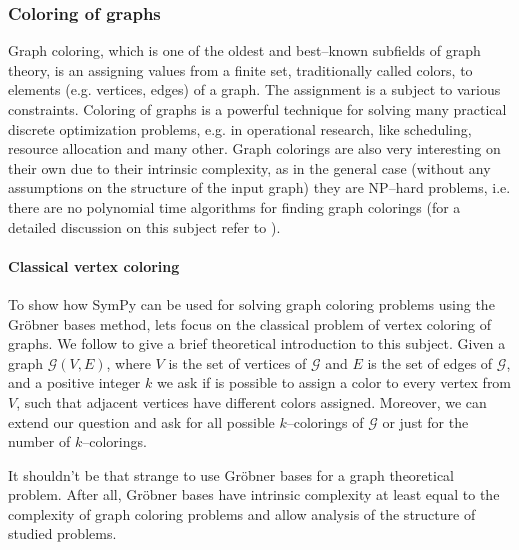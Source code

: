 \subsubsection{Coloring of graphs}

Graph coloring, which is one of the oldest and best--known subfields of graph theory, is an
assigning values from a finite set, traditionally called colors, to elements (e.g. vertices,
edges) of a graph. The assignment is a subject to various constraints. Coloring of graphs is
a powerful technique for solving many practical discrete optimization problems, e.g. in
operational research, like scheduling, resource allocation and many other. Graph colorings
are also very interesting on their own due to their intrinsic complexity, as in the general
case (without any assumptions on the structure of the input graph) they are NP--hard problems,
i.e. there are no polynomial time algorithms for finding graph colorings (for a detailed
discussion on this subject refer to \cite{Kubale2004color}).


\paragraph{Classical vertex coloring}

To show how SymPy can be used for solving graph coloring problems using the Gröbner
bases method, lets focus on the classical problem of vertex coloring of graphs. We follow
\cite{Adams1994intro} to give a brief theoretical introduction to this subject. Given a graph
$\mathcal{G}(V, E)$, where $V$ is the set of vertices of $\mathcal{G}$ and $E$ is the set
of edges of $\mathcal{G}$, and a positive integer $k$ we ask if is possible to assign a
color to every vertex from $V$, such that adjacent vertices have different colors assigned.
Moreover, we can extend our question and ask for all possible $k$--colorings of $\mathcal{G}$
or just for the number of $k$--colorings.

It shouldn't be that strange to use Gröbner bases for a graph theoretical problem. After
all, Gröbner bases have intrinsic complexity at least equal to the complexity of graph
coloring problems and allow analysis of the structure of studied problems.


